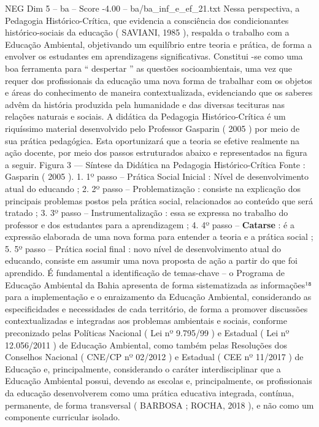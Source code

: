 \begin{textsample}{NEG Dim 5 – ba – Score -4.00 – ba/ba\_inf\_e\_ef\_21.txt}
Nessa perspectiva, a Pedagogia Histórico-Crítica, que evidencia a consciência dos condicionantes histórico-sociais da educação ( SAVIANI, 1985 ), respalda o trabalho com a Educação Ambiental, objetivando um equilíbrio entre teoria e prática, de forma a envolver os estudantes em aprendizagens significativas.
Constitui -se como uma boa ferramenta para “ despertar ” as questões socioambientais, uma vez que requer dos profissionais da educação uma nova forma de trabalhar com os objetos e áreas do conhecimento de maneira contextualizada, evidenciando que os saberes advêm da história produzida pela humanidade e das diversas tecituras nas relações naturais e sociais.
A didática da Pedagogia Histórico-Crítica é um riquíssimo material desenvolvido pelo Professor Gasparin ( 2005 ) por meio de sua prática pedagógica.
Esta oportunizará que a teoria se efetive realmente na ação docente, por meio dos passos estruturados abaixo e representados na figura a seguir.
Figura 3 — Síntese da Didática na Pedagogia Histórico-Crítica Fonte : Gasparin ( 2005 ). 1. 1º passo – Prática Social Inicial : Nível de desenvolvimento atual do educando ; 2. 2º passo – Problematização : consiste na explicação dos principais problemas postos pela prática social, relacionados ao conteúdo que será tratado ; 3. 3º passo – Instrumentalização : essa se expressa no trabalho do professor e dos estudantes para a aprendizagem ; 4. 4º passo – \textbf{Catarse} : é a expressão elaborada de uma nova forma para entender a teoria e a prática social ; 5. 5º passo – Prática social final : novo nível de desenvolvimento atual do educando, consiste em assumir uma nova proposta de ação a partir do que foi aprendido.
É fundamental a identificação de temas-chave – o Programa de Educação Ambiental da Bahia apresenta de forma sistematizada as informações¹⁸ para a implementação e o enraizamento da Educação Ambiental, considerando as especificidades e necessidades de cada território, de forma a promover discussões contextualizadas e integradas aos problemas ambientais e sociais, conforme preconizado pelas Políticas Nacional ( Lei nº 9.795/99 ) e Estadual ( Lei nº 12.056/2011 ) de Educação Ambiental, como também pelas Resoluções dos Conselhos Nacional ( CNE/CP nº 02/2012 ) e Estadual ( CEE nº 11/2017 ) de Educação e, principalmente, considerando o caráter interdisciplinar que a Educação Ambiental possui, devendo as escolas e, principalmente, os profissionais da educação desenvolverem como uma prática educativa integrada, contínua, permanente, de forma transversal ( BARBOSA ; ROCHA, 2018 ), e não como um componente curricular isolado.

\end{textsample}
